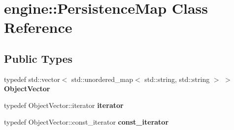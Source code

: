 \hypertarget{classengine_1_1_persistence_map}{}\section{engine\+:\+:Persistence\+Map Class Reference}
\label{classengine_1_1_persistence_map}
\subsection*{Public Types}
\begin{DoxyCompactItemize}
\item 
typedef std\+::vector$<$ std\+::unordered\+\_\+map$<$ std\+::string, std\+::string $>$ $>$ {\bfseries Object\+Vector}\hypertarget{classengine_1_1_persistence_map_aa5ba34f0570235795c0e1daa4c97499b}{}\label{classengine_1_1_persistence_map_aa5ba34f0570235795c0e1daa4c97499b}

\item 
typedef Object\+Vector\+::iterator {\bfseries iterator}\hypertarget{classengine_1_1_persistence_map_a94cc5f46bddd5fe4d4f9cc16013c6e4f}{}\label{classengine_1_1_persistence_map_a94cc5f46bddd5fe4d4f9cc16013c6e4f}

\item 
typedef Object\+Vector\+::const\+\_\+iterator {\bfseries const\+\_\+iterator}\hypertarget{classengine_1_1_persistence_map_ac4a64e677fd385c7dd669f235ccfe315}{}\label{classengine_1_1_persistence_map_ac4a64e677fd385c7dd669f235ccfe315}

\end{DoxyCompactItemize}
